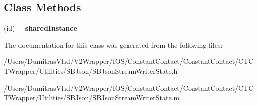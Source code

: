 \subsection*{Class Methods}
\begin{DoxyCompactItemize}
\item 
\hypertarget{interface_s_b_json_stream_writer_state_ab01e9e997789a8f04bc4730801aab8ca}{(id) + {\bfseries shared\-Instance}}\label{interface_s_b_json_stream_writer_state_ab01e9e997789a8f04bc4730801aab8ca}

\end{DoxyCompactItemize}


The documentation for this class was generated from the following files\-:\begin{DoxyCompactItemize}
\item 
/\-Users/\-Dumitras\-Vlad/\-V2\-Wrapper/\-I\-O\-S/\-Constant\-Contact/\-Constant\-Contact/\-C\-T\-C\-T\-Wrapper/\-Utilities/\-S\-B\-Json/S\-B\-Json\-Stream\-Writer\-State.\-h\item 
/\-Users/\-Dumitras\-Vlad/\-V2\-Wrapper/\-I\-O\-S/\-Constant\-Contact/\-Constant\-Contact/\-C\-T\-C\-T\-Wrapper/\-Utilities/\-S\-B\-Json/S\-B\-Json\-Stream\-Writer\-State.\-m\end{DoxyCompactItemize}
